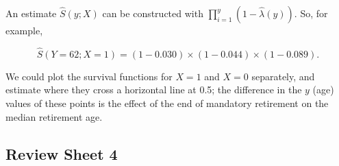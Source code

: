 \documentclass{article}
\begin{document}
\begin{enumerate}
\begin{enumerate}
		An estimate $\hat{S}(y;X)$ can be constructed with $\prod \limits_{i=1}^y (1-\hat{\lambda}(y))$. So, for example, 

		$$\hat{S}(Y=62;X=1) = (1 - 0.030) \times (1 - 0.044) \times (1 - 0.089).$$

		We could plot the survival functions for $X = 1$ and $X = 0$ separately, and estimate where they cross a horizontal line at 0.5; the difference in the $y$ (age) values of these points is the effect of the end of mandatory retirement on the median retirement age.

	\end{enumerate}

\end{enumerate}

\subsection*{Review Sheet 4}
\end{document}
